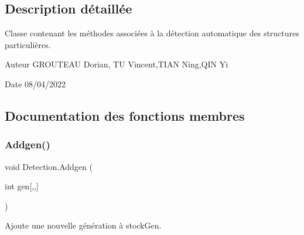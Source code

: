 \subsection{Description détaillée}
Classe contenant les méthodes associées à la détection automatique des structures particulières. 

\begin{DoxyAuthor}{Auteur}
G\+R\+O\+U\+T\+E\+AU Dorian, TU Vincent,T\+I\+AN Ning,Q\+IN Yi 
\end{DoxyAuthor}
\begin{DoxyDate}{Date}
08/04/2022 
\end{DoxyDate}


\subsection{Documentation des fonctions membres}
\mbox{\label{class_detection_a92c60be1a69ea74b7f7bef04a0e53238}} 
\subsubsection{\texorpdfstring{Addgen()}{Addgen()}}
{\footnotesize\ttfamily void Detection.\+Addgen (\begin{DoxyParamCaption}\item[{int}]{gen\mbox{[},,\mbox{]} }\end{DoxyParamCaption})\hspace{0.3cm}{\ttfamily [inline]}}



Ajoute une nouvelle génération à stock\+Gen. 



